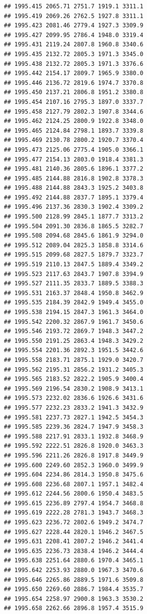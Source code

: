 \documentclass[
]{book}
\begin{document}
\begin{verbatim}
## 1995.415 2065.71 2751.7 1919.1 3311.1
## 1995.419 2069.26 2762.5 1927.8 3311.1
## 1995.423 2081.46 2779.4 1927.3 3309.9
## 1995.427 2099.95 2786.4 1948.0 3319.4
## 1995.431 2119.24 2807.8 1960.8 3340.6
## 1995.435 2132.72 2805.3 1971.3 3345.0
## 1995.438 2132.72 2805.3 1971.3 3376.6
## 1995.442 2154.17 2809.7 1965.9 3380.0
## 1995.446 2136.72 2819.6 1974.7 3370.8
## 1995.450 2137.21 2806.8 1951.2 3380.8
## 1995.454 2107.16 2795.3 1897.0 3337.7
## 1995.458 2127.79 2802.3 1907.8 3344.6
## 1995.462 2124.25 2800.9 1922.8 3348.0
## 1995.465 2124.84 2798.1 1893.7 3339.8
## 1995.469 2130.78 2800.2 1920.7 3370.4
## 1995.473 2125.06 2775.4 1905.0 3366.1
## 1995.477 2154.13 2803.0 1918.4 3381.3
## 1995.481 2140.36 2805.6 1896.1 3377.2
## 1995.485 2144.88 2816.8 1902.8 3378.3
## 1995.488 2144.88 2843.3 1925.2 3403.8
## 1995.492 2144.88 2837.7 1895.1 3379.4
## 1995.496 2137.36 2830.3 1902.4 3309.2
## 1995.500 2128.99 2845.1 1877.7 3313.2
## 1995.504 2091.30 2836.8 1865.5 3282.7
## 1995.508 2094.68 2845.6 1861.9 3294.0
## 1995.512 2089.04 2825.3 1858.8 3314.6
## 1995.515 2099.68 2827.5 1879.7 3323.7
## 1995.519 2110.13 2847.5 1889.4 3349.2
## 1995.523 2117.63 2843.7 1907.8 3394.9
## 1995.527 2111.35 2833.7 1889.5 3388.3
## 1995.531 2163.37 2848.4 1950.8 3462.9
## 1995.535 2184.39 2842.9 1949.4 3455.0
## 1995.538 2194.15 2847.3 1961.3 3464.0
## 1995.542 2200.32 2867.9 1961.7 3450.6
## 1995.546 2193.72 2869.7 1948.3 3447.2
## 1995.550 2191.25 2863.4 1948.3 3429.2
## 1995.554 2201.36 2892.3 1951.5 3442.6
## 1995.558 2183.71 2875.1 1929.0 3420.7
## 1995.562 2195.31 2856.2 1931.2 3405.3
## 1995.565 2183.52 2822.2 1905.9 3400.4
## 1995.569 2196.54 2830.2 1908.9 3413.1
## 1995.573 2232.02 2836.6 1926.6 3431.6
## 1995.577 2232.23 2833.2 1941.3 3432.9
## 1995.581 2237.73 2827.1 1942.5 3454.3
## 1995.585 2239.36 2824.7 1947.9 3458.3
## 1995.588 2217.91 2833.1 1932.8 3468.9
## 1995.592 2222.51 2826.8 1920.0 3463.3
## 1995.596 2211.26 2826.8 1917.8 3449.9
## 1995.600 2249.60 2852.3 1960.0 3499.9
## 1995.604 2234.86 2814.3 1950.8 3475.6
## 1995.608 2236.68 2807.1 1957.1 3482.4
## 1995.612 2244.56 2800.6 1950.4 3483.5
## 1995.615 2236.89 2797.4 1954.7 3468.8
## 1995.619 2222.28 2781.3 1943.7 3468.3
## 1995.623 2236.72 2802.6 1949.2 3474.7
## 1995.627 2228.44 2820.1 1946.2 3467.5
## 1995.631 2208.41 2807.2 1946.2 3441.4
## 1995.635 2236.73 2838.4 1946.2 3444.4
## 1995.638 2251.64 2880.6 1970.4 3465.1
## 1995.642 2253.93 2880.0 1967.3 3470.6
## 1995.646 2265.86 2889.5 1971.6 3509.8
## 1995.650 2269.60 2886.7 1984.4 3535.7
## 1995.654 2258.97 2900.8 1963.3 3530.2
## 1995.658 2262.66 2896.8 1957.4 3515.9

\end{verbatim}
\end{document}
